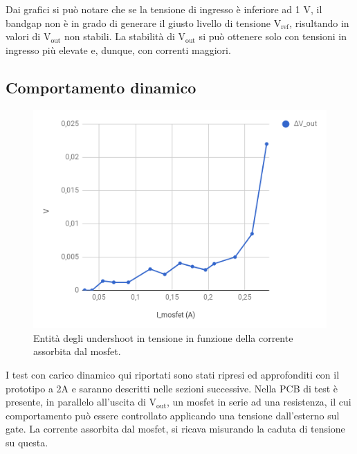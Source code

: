 Dai grafici si può notare che se la tensione di ingresso è inferiore ad 1 V, il bandgap non è in grado di generare il giusto livello di tensione $\mathrm{V_{ref}}$, risultando in valori di $\mathrm{V_{out}}$ non stabili.
La stabilità di $\mathrm{V_{out}}$ si può ottenere solo con tensioni in ingresso più elevate e, dunque, con correnti maggiori.

\subsection{Comportamento dinamico}

\begin{figure}[!hbt]
\centering
\includegraphics[scale=.5]{Immagini/SLDO5singlepulse}
\caption{Entità degli undershoot in tensione in funzione della corrente assorbita dal mosfet.}
\label{SLDO5singlepulse}
\end{figure}

I test con carico dinamico qui riportati sono stati ripresi ed approfonditi con il prototipo a 2A e saranno descritti nelle sezioni successive.
Nella PCB di test è presente, in parallelo all'uscita di $\mathrm{V_{out}}$, un mosfet in serie ad una resistenza, il cui comportamento può essere controllato applicando una tensione dall'esterno sul gate. 
La corrente assorbita dal mosfet, si ricava misurando la caduta di tensione su questa. 

